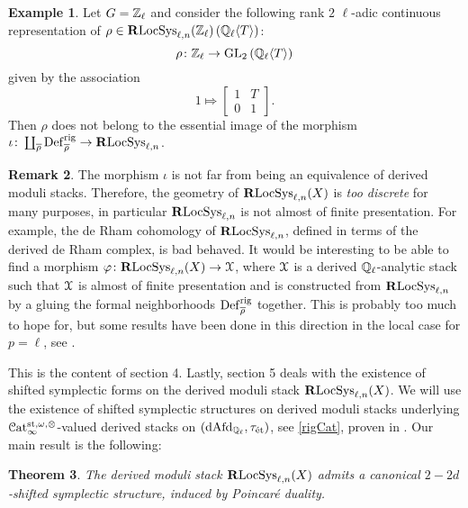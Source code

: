 \documentclass[10pt,a4paper]{amsart}
\numberwithin{equation}{subsection}
\theoremstyle{plain}
\newtheorem{theorem}{Theorem}[section]
\theoremstyle{definition}
\newtheorem{exem}[theorem]{Example}
\newtheorem{rema}[theorem]{Remark}
\theoremstyle{remark}
\numberwithin{equation}{section}
\begin{document}
\begin{exem}
Let $G= \mathbb Z_\ell$ and consider the following rank $2$ $\ell$-adic continuous representation of $\rho \in \mathbf R \mathrm{LocSys}_{\ell, n}(\mathbb Z_\ell) \left(\mathbb{Q}_\ell \langle T \rangle \right)$:
	\[
		\rho \colon \mathbb Z_\ell \to \mathrm{GL}_2 \left( \mathbb{Q}_\ell \langle T \rangle \right)
	\]
given by the association
	\[
		1 \Mapsto 
		\begin{bmatrix}
			1 & T \\
			0 & 1
		\end{bmatrix}.
	\]
Then $\rho$ does not belong to the essential image of the morphism $\iota \colon \coprod_{\overline{\rho}} \mathbf{\mathrm{Def}}^{\mathrm{rig}}_{\overline{\rho}} \to \mathbf R \mathrm{LocSys}_{\ell, n}$.
\end{exem}

\begin{rema}
The morphism $\iota$ is not far from being an equivalence of derived moduli stacks. Therefore, the geometry of $\mathbf R \mathrm{LocSys}_{\ell, n}(X)
$ is \emph{too discrete} for many purposes, in particular $\mathbf R \mathrm{LocSys}_{\ell, n}$ is not almost of finite presentation. For example, the de Rham cohomology of $\mathbf R \mathrm{LocSys}_{\ell, n}$, defined in terms of the derived de Rham
complex, is bad behaved. It would be interesting to be able to find a morphism $\varphi \colon \mathbf R \mathrm{LocSys}_{\ell, n}(X) \to \mathcal X$, where $\mathcal X$ is a derived $\mathbb{Q}_\ell$-analytic stack such that $\mathcal X$ is almost of finite presentation and is constructed from $\mathbf R \mathrm{LocSys}_{\ell, n}$ by a
gluing the formal neighborhoods $\mathbf{\mathrm{Def}}^{\mathrm{rig}}_{\overline{\rho}}$ together. This is probably too much to hope for, but some results have been done in this direction in the local case for $p = \ell$, see \cite{gee}.
\end{rema}

This is the content of section 4.
 Lastly, section 5 deals with the existence of shifted symplectic forms on
the derived moduli stack $\mathbf R \mathrm{LocSys}_{\ell, n}(X)$. We will use the existence of shifted symplectic structures on derived moduli stacks underlying $\mathcal{C}\mathrm{at}^{\mathrm{st}, \omega, \otimes}_{\infty}$-valued derived stacks on $(\mathrm{dAfd}_{\mathbb{Q}_\ell}, \tau_{\text{\'et}})$, see \cref{rigCat}, proven in \cite{toen_ss}. Our main result is the
following:

 \begin{theorem} \label{int_thm1}
 The derived moduli stack $\mathbf R \mathrm{LocSys}_{\ell, n} (X)$ admits a canonical $2-2d$-shifted symplectic structure, induced by Poincar\'e duality.
 \end{theorem}
\end{document}
